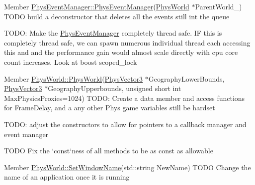 \label{todo__todo000006}
\hypertarget{todo__todo000006}{}
 
\begin{DoxyDescription}
\item[Member \hyperlink{classPhysEventManager_a1355f36d99de303cec6f3b27cadaa9ff}{PhysEventManager::PhysEventManager}(\hyperlink{classPhysWorld}{PhysWorld} $\ast$ParentWorld\_\-) ]TODO build a deconstructor that deletes all the events still int the queue 

TODO: Make the \hyperlink{classPhysEventManager}{PhysEventManager} completely thread safe. IF this is completely thread safe, we can spawn numerous individual thread each accessing this and and the performance gain would almost scale directly with cpu core count increases. Look at boost scoped\_\-lock 
\end{DoxyDescription}

\label{todo__todo000013}
\hypertarget{todo__todo000013}{}
 
\begin{DoxyDescription}
\item[Member \hyperlink{classPhysWorld_a3228c98369082139722d3c918d735e6c}{PhysWorld::PhysWorld}(\hyperlink{classPhysVector3}{PhysVector3} $\ast$GeographyLowerBounds, \hyperlink{classPhysVector3}{PhysVector3} $\ast$GeographyUpperbounds, unsigned short int MaxPhysicsProxies=1024) ]TODO: Create a data member and access functions for FrameDelay, and a any other Phys game variables still be hardset 

TODO: adjust the constructors to allow for pointers to a callback manager and event manager 

TODO Fix the `const`ness of all methods to be as const as allowable 
\end{DoxyDescription}

\label{todo__todo000012}
\hypertarget{todo__todo000012}{}
 
\begin{DoxyDescription}
\item[Member \hyperlink{classPhysWorld_adb5ba2b5a3140c5d7033d3180e3f7342}{PhysWorld::SetWindowName}(std::string NewName) ]TODO Change the name of an application once it is running 
\end{DoxyDescription}